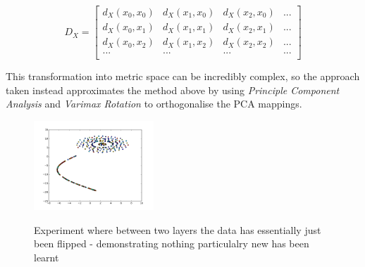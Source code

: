 \documentclass[a4paper,11pt,titlepage]{article}
\begin{document}
		$$
		D_X = \left[\begin{array}{cccc} 
		  d_X(x_0, x_0) & d_X(x_1, x_0) & d_X(x_2, x_0) & ... \\
		  d_X(x_0, x_1) & d_X(x_1, x_1) & d_X(x_2, x_1) & ... \\
		  d_X(x_0, x_2) & d_X(x_1, x_2) & d_X(x_2, x_2) & ... \\
		  ... & ... & ... & ... \\ 
		\end{array} \right]
		$$
		
		This transformation into metric space can be incredibly complex, so the approach taken instead approximates the method above by using \textit{Principle Component Analysis} and \textit{Varimax Rotation} to orthogonalise the PCA mappings.
		
		\begin{figure}[H]
    			\qquad
    			{{\includegraphics[width=0.4\textwidth]
    				{img/sne_plot_E2_L3_rotation.png} 
    			}}%
    			\caption{Experiment where between two layers the data has essentially just been flipped - demonstrating nothing particulalry new has been learnt}%
		\end{figure}
\end{document}

